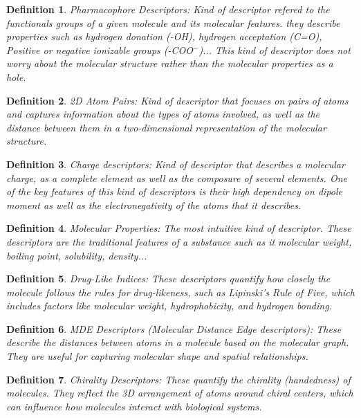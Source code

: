 \documentclass[12pt,letterpaper]{article}
\newtheorem{definition}{Definition}
\begin{document}
\begin{multicols}{2}
\begin{definition}
Pharmacophore Descriptors: Kind of descriptor refered to the functionals groups of a given molecule and its molecular features. they describe properties such as hydrogen donation (-OH), hydrogen acceptation (C=O), Positive or negative ionizable groups (-COO$^-$)... This kind of descriptor does not worry about the molecular structure rather than the molecular properties as a hole.\cite{PharmacophoreDescriptorsBook}
\end{definition}

\begin{definition}
2D Atom Pairs: Kind of descriptor that focuses on pairs of atoms and captures information about the types of atoms involved, as well as the distance between them in a two-dimensional representation of the molecular structure.
\end{definition}

\begin{definition}
Charge descriptors: Kind of descriptor that describes a molecular charge, as a complete element as well as the composure of several elements. One of the key features of this kind of descriptors is their high dependency on dipole moment as well as the electronegativity of the atoms that it describes.
\end{definition}

\begin{definition}
Molecular Properties: The most intuitive kind of descriptor. These descriptors are the \emph{traditional features} of a substance such as it molecular weight, boiling point, solubility, density...
\end{definition}

\begin{definition}
Drug-Like Indices: These descriptors quantify how closely the molecule follows the rules for drug-likeness, such as Lipinski’s Rule of Five, which includes factors like molecular weight, hydrophobicity, and hydrogen bonding.
\end{definition}

\begin{definition}
MDE Descriptors (Molecular Distance Edge descriptors): These describe the distances between atoms in a molecule based on the molecular graph. They are useful for capturing molecular shape and spatial relationships.
\end{definition}

\begin{definition}
Chirality Descriptors: These quantify the chirality (handedness) of molecules. They reflect the 3D arrangement of atoms around chiral centers, which can influence how molecules interact with biological systems.
\end{definition}


\end{multicols}
\end{document}
